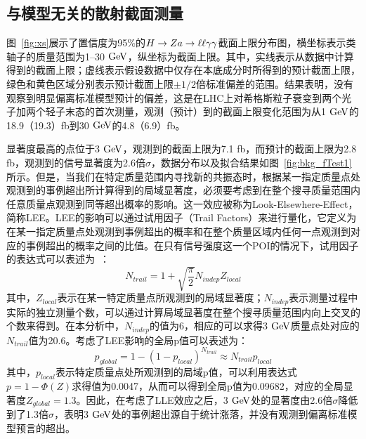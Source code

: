 \subsection{与模型无关的散射截面测量}

图~\ref{fig:xs}展示了置信度为95\%的$H\to Za\to\ell\ell\gamma\gamma$截面上限分布图，横坐标表示类轴子的质量范围为1--30$\GeV$，纵坐标为截面上限。其中，实线表示从数据中计算得到的截面上限；虚线表示假设数据中仅存在本底成分时所得到的预计截面上限，绿色和黄色区域分别表示预计截面上限$\pm1/2$倍标准偏差的范围。结果表明，没有观察到明显偏离标准模型预计的偏差，这是在LHC上对希格斯粒子衰变到两个光子加两个轻子末态的首次测量，观测（预计）到的截面上限变化范围为从1$\GeV$的18.9（19.3）\si{fb}到30$\GeV$的4.8（6.9）\si{fb}。

显著度最高的点位于3$\GeV$，观测到的截面上限为7.1 \si{fb}，而预计的截面上限为2.8 \si{fb}，观测到的信号显著度为2.6倍$\sigma$，数据分布以及拟合结果如图~\ref{fig:bkg_fTest1}所示。但是，当我们在特定质量范围内寻找新的共振态时，根据某一指定质量点处观测到的事例超出所计算得到的局域显著度，必须要考虑到在整个搜寻质量范围内任意质量点观测到同等超出概率的影响。这一效应被称为Look-Elsewhere-Effect，简称LEE。LEE的影响可以通过试用因子（Trail Factors）来进行量化，它定义为在某一指定质量点处观测到事例超出的概率和在整个质量区域内任何一点观测到对应的事例超出的概率之间的比值。在只有信号强度这一个POI的情况下，试用因子的表达式可以表述为~\cite{gross2010trial}：
\begin{equation}
N_{trail} = 1 + \sqrt{\frac{\pi}{2}}N_{indep}Z_{local}
\end{equation}
其中，$Z_{local}$表示在某一特定质量点所观测到的局域显著度；$N_{indep}$表示测量过程中实际的独立测量个数，可以通过计算局域显著度在整个搜寻质量范围内向上交叉的个数来得到。在本分析中，$N_{indep}$的值为6，相应的可以求得3$\GeV$质量点处对应的$N_{trail}$值为20.6。考虑了LEE影响的全局p值可以表述为：
\begin{equation}
p_{global} = 1 - (1-p_{local})^{N_{trail}}\approx N_{trail}p_{local}
\end{equation}
其中，$p_{local}$表示特定质量点处所观测到的局域p值，可以利用表达式$p=1-\Phi(Z)$求得值为0.0047，从而可以得到全局p值为0.09682，对应的全局显著度$Z_{global} = 1.3$。因此，在考虑了LLE效应之后，3$\GeV$处的显著度由2.6倍$\sigma$降低到了1.3倍$\sigma$，表明3$\GeV$处的事例超出源自于统计涨落，并没有观测到偏离标准模型预言的超出。

